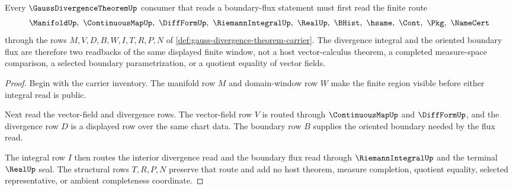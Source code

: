 \begin{theorem}
\label{thm:gauss-divergence-theorem-flux-boundary-route}
Every $\GaussDivergenceTheoremUp$ consumer that reads a boundary-flux statement must first read the finite route
$$
\ManifoldUp,\ \ContinuousMapUp,\ \DiffFormUp,\ \RiemannIntegralUp,\ \RealUp,\ \BHist,\ \hsame,\ \Cont,\ \Pkg,\ \NameCert
$$
through the rows $M,V,D,B,W,I,T,R,P,N$ of \autoref{def:gauss-divergence-theorem-carrier}. The divergence integral and the oriented boundary flux are therefore two readbacks of the same displayed finite window, not a host vector-calculus theorem, a completed measure-space comparison, a selected boundary parametrization, or a quotient equality of vector fields.
\end{theorem}
\begin{proof}
Begin with the carrier inventory. The manifold row $M$ and domain-window row $W$ make the finite region visible before either integral read is public.

Next read the vector-field and divergence rows. The vector-field row $V$ is routed through $\ContinuousMapUp$ and $\DiffFormUp$, and the divergence row $D$ is a displayed row over the same chart data. The boundary row $B$ supplies the oriented boundary needed by the flux read.

The integral row $I$ then routes the interior divergence read and the boundary flux read through $\RiemannIntegralUp$ and the terminal $\RealUp$ seal. The structural rows $T,R,P,N$ preserve that route and add no host theorem, measure completion, quotient equality, selected representative, or ambient completeness coordinate.
\end{proof}




